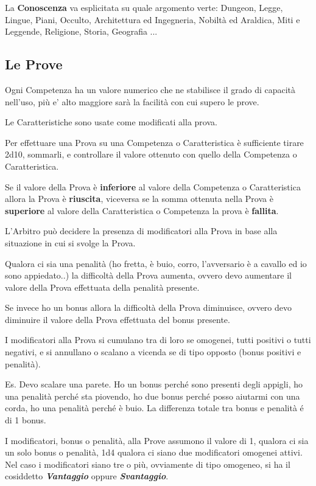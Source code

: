 \documentclass[12pt,a4paper,twoside,openany]{book}
\begin{document}
La \textbf{Conoscenza} va esplicitata su quale argomento verte: Dungeon, Legge, Lingue, Piani, Occulto, Architettura ed Ingegneria, Nobiltà ed Araldica, Miti e Leggende, Religione, Storia, Geografia ...\\

\begin{multicols}{2}

\subsection{Le Prove}

Ogni Competenza ha un valore numerico che ne stabilisce il grado di capacità nell'uso, più e' alto maggiore sarà la facilità con cui supero le prove.

Le Caratteristiche sono usate come modificati alla prova.

Per effettuare una Prova su una Competenza o Caratteristica è sufficiente tirare 2d10, sommarli, e controllare il valore ottenuto con quello della Competenza o Caratteristica.

Se il valore della Prova è \textbf{inferiore} al valore della Competenza o Caratteristica allora la Prova è \textbf{riuscita}, viceversa se la somma ottenuta nella Prova è \textbf{superiore} al valore della Caratteristica o Competenza la prova è \textbf{fallita}.

L'Arbitro può decidere la presenza di modificatori alla Prova in base alla situazione in cui si svolge la Prova.

Qualora ci sia una penalità (ho fretta, è buio, corro, l'avversario è a cavallo ed io sono appiedato..) la difficoltà della Prova aumenta, ovvero devo aumentare il valore della Prova effettuata della penalità presente.

Se invece ho un bonus allora la difficoltà della Prova diminuisce, ovvero devo diminuire il valore della Prova effettuata del bonus presente.

I modificatori alla Prova si cumulano tra di loro se omogenei, tutti positivi o tutti negativi, e si annullano o scalano a vicenda se di tipo opposto (bonus positivi e penalità).

Es. Devo scalare una parete. Ho un bonus perché sono presenti degli appigli, ho una penalità perché sta piovendo, ho due bonus perché posso aiutarmi con una corda, ho una penalità perché è buio. La differenza totale tra bonus e penalità é di 1 bonus.

I modificatori, bonus o penalità, alla Prove assumono il valore di 1, qualora ci sia un solo bonus o penalità, 1d4 qualora ci siano due modificatori omogenei attivi. Nel caso i modificatori siano tre o più, ovviamente di tipo omogeneo, si ha il cosiddetto \textbf{\textit{Vantaggio}} oppure \textbf{\textit{Svantaggio}}.


\end{multicols}
\end{document}
